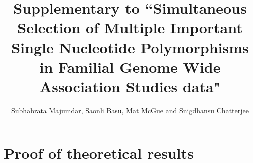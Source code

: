 \documentclass[aoas,preprint]{imsart}
\numberwithin{equation}{section}
\begin{document}
\newtheorem{Theorem}{Theorem}[section]
\newtheorem{Lemma}[Theorem]{Lemma}
\newtheorem{Corollary}[Theorem]{Corollary}
\newtheorem{Proposition}[Theorem]{Proposition}
\newtheorem{Conjecture}[Theorem]{Conjecture}
\theoremstyle{definition} \newtheorem{Definition}[Theorem]{Definition}

\title{Supplementary to ``Simultaneous Selection of Multiple Important Single Nucleotide Polymorphisms in Familial Genome Wide Association Studies data"}
\date{}
\author{Subhabrata Majumdar, Saonli Basu, Mat McGue and Snigdhansu Chatterjee}
\maketitle

\appendix

\section{Proof of theoretical results}
\end{document}
